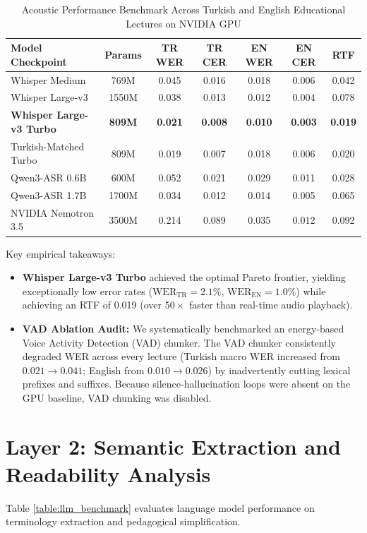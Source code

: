 \documentclass[a4paper,12pt]{report}
\begin{document}
\begin{table}[h!]
\centering
\caption{Acoustic Performance Benchmark Across Turkish and English Educational Lectures on NVIDIA GPU}
\label{table:asr_benchmark}
\baselineskip
\small
\begin{tabular}{|l|c|c|c|c|c|c|}
\hline
\textbf{Model Checkpoint} & \textbf{Params} & \textbf{TR WER} & \textbf{TR CER} & \textbf{EN WER} & \textbf{EN CER} & \textbf{RTF} \\ \hline
Whisper Medium & 769M & 0.045 & 0.016 & 0.018 & 0.006 & 0.042 \\ \hline
Whisper Large-v3 & 1550M & 0.038 & 0.013 & 0.012 & 0.004 & 0.078 \\ \hline
\textbf{Whisper Large-v3 Turbo} & \textbf{809M} & \textbf{0.021} & \textbf{0.008} & \textbf{0.010} & \textbf{0.003} & \textbf{0.019} \\ \hline
Turkish-Matched Turbo & 809M & 0.019 & 0.007 & 0.018 & 0.006 & 0.020 \\ \hline
Qwen3-ASR 0.6B & 600M & 0.052 & 0.021 & 0.029 & 0.011 & 0.028 \\ \hline
Qwen3-ASR 1.7B & 1700M & 0.034 & 0.012 & 0.014 & 0.005 & 0.065 \\ \hline
NVIDIA Nemotron 3.5 & 3500M & 0.214 & 0.089 & 0.035 & 0.012 & 0.092 \\ \hline
\end{tabular}
\end{table}

Key empirical takeaways:
\begin{itemize}
    \item \textbf{Whisper Large-v3 Turbo} achieved the optimal Pareto frontier, yielding exceptionally low error rates ($\text{WER}_{\text{TR}} = 2.1\%$, $\text{WER}_{\text{EN}} = 1.0\%$) while achieving an RTF of 0.019 (over $50\times$ faster than real-time audio playback).
    \item \textbf{VAD Ablation Audit:} We systematically benchmarked an energy-based Voice Activity Detection (VAD) chunker. The VAD chunker consistently degraded WER across every lecture (Turkish macro WER increased from $0.021 \to 0.041$; English from $0.010 \to 0.026$) by inadvertently cutting lexical prefixes and suffixes. Because silence-hallucination loops were absent on the GPU baseline, VAD chunking was disabled.
\end{itemize}

\section{Layer 2: Semantic Extraction and Readability Analysis}
Table \ref{table:llm_benchmark} evaluates language model performance on terminology extraction and pedagogical simplification.
\end{document}
